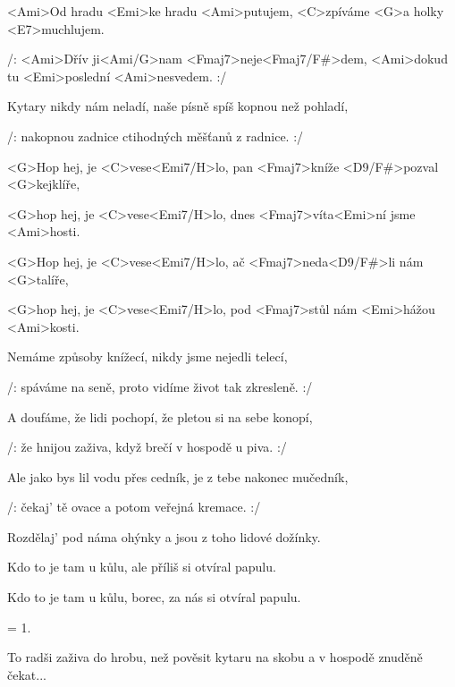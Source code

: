 

\zs
<Ami>Od hradu <Emi>ke hradu <Ami>putujem,
<C>zpíváme <G>a holky <E7>muchlujem.

/: <Ami>Dřív ji<Ami/G>nam <Fmaj7>neje<Fmaj7/F#>dem,
<Ami>dokud tu <Emi>poslední <Ami>nesvedem. :/
\ks

\zs
Kytary nikdy nám neladí,
naše písně spíš kopnou než pohladí,

/: nakopnou zadnice
ctihodných měšťanů z radnice. :/
\ks

\zr
<G>Hop hej, je <C>vese<Emi7/H>lo,
pan <Fmaj7>kníže <D9/F#>pozval <G>kejklíře,

<G>hop hej, je <C>vese<Emi7/H>lo,
dnes <Fmaj7>víta<Emi>ní jsme <Ami>hosti.

<G>Hop hej, je <C>vese<Emi7/H>lo,
ač <Fmaj7>neda<D9/F#>li nám <G>talíře,

<G>hop hej, je <C>vese<Emi7/H>lo,
pod <Fmaj7>stůl nám <Emi>hážou <Ami>kosti.
\kr

\zs
Nemáme způsoby knížecí,
nikdy jsme nejedli telecí,

/: spáváme na seně,
proto vidíme život tak zkresleně. :/
\ks

\zs
A doufáme, že lidi pochopí,
že pletou si na sebe konopí,

/: že hnijou zaživa,
když brečí v hospodě u piva. :/
\ks

\zr \kr

\zs
Ale jako bys lil vodu přes cedník,
je z tebe nakonec mučedník,

/: čekaj' tě ovace
a potom veřejná kremace. :/
\ks

\zs
Rozdělaj' pod náma ohýnky
a jsou z toho lidové dožínky.

Kdo to je tam u kůlu,
ale příliš si otvíral papulu.

Kdo to je tam u kůlu,
borec, za nás si otvíral papulu.
\ks

\zr \kr

\zs
= 1.
\ks

\zs
To radši zaživa do hrobu,
než pověsit kytaru na skobu
a v hospodě znuděně čekat...
\ks

\kp




























































